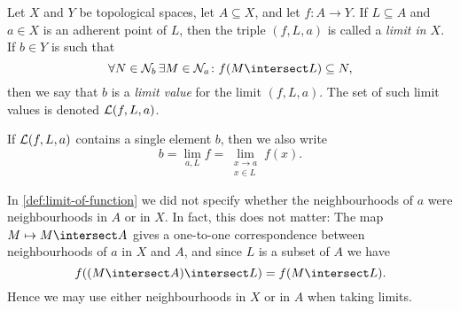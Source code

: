 \documentclass[article, a4paper, 11pt, oneside]{memoir}
\numberwithin{equation}{chapter}
\begin{document}
\begin{definition}
    \label{def:limit-of-function}
    Let $X$ and $Y$ be topological spaces, let $A \subseteq X$, and let $f \colon A \to Y$. If $L \subseteq A$ and $a \in X$ is an adherent point of $L$, then the triple $(f,L,a)$ is called a \emph{limit in $X$}. If $b \in Y$ is such that
    \begin{equation*}
        \forall N \in \nhoods{b}\,
            \exists M \in \nhoods{a} \colon
            f(M \intersect L) \subseteq N,
    \end{equation*}
    then we say that $b$ is a \emph{limit value} for the limit $(f,L,a)$. The set of such limit values is denoted $\mathcal{L}(f,L,a)$.

    If $\mathcal{L}(f,L,a)$ contains a single element $b$, then we also write
    \begin{equation*}
        b
            = \lim_{a, L} f
            = \lim_{\substack{x \to a \\ x \in L}} f(x).
    \end{equation*}



\end{definition}

\begin{remark}
    \label{rem:limit-neighbourhoods}
    In \cref{def:limit-of-function} we did not specify whether the neighbourhoods of $a$ were neighbourhoods in $A$ or in $X$. In fact, this does not matter: The map $M \mapsto M \intersect A$ gives a one-to-one correspondence between neighbourhoods of $a$ in $X$ and $A$, and since $L$ is a subset of $A$ we have
    \begin{equation*}
        f((M \intersect A) \intersect L) = f(M \intersect L).
    \end{equation*}
    Hence we may use either neighbourhoods in $X$ or in $A$ when taking limits.
\end{remark}
\end{document}
